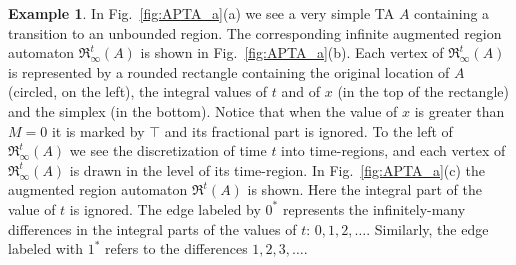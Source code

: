 \documentclass[11pt]{amsart}
\theoremstyle{definition}
\newtheorem{example}[theorem]{Example}
\newcommand{\ARRR}{\mathfrak{R}^t}
\newcommand{\IARRR}{\mathfrak{R}_{\infty}^{t}}
\begin{document}
\begin{example}
	In Fig.~\ref{fig:APTA_a}(a) we see a very simple TA $A$ containing a transition to an unbounded region.
	The corresponding infinite augmented region automaton $\IARRR(A)$ is shown in Fig.~\ref{fig:APTA_a}(b).
	Each vertex of $\IARRR(A)$ is represented by a rounded rectangle containing the original location of $A$ (circled, on the left), the integral values of $t$ and of $x$ (in the top of the rectangle) and the simplex (in the bottom).
	Notice that when the value of $x$ is greater than $M=0$ it is marked by $\top$ and its fractional part is ignored.
	To the left of $\IARRR(A)$ we see the discretization of time $t$ into time-regions, and each vertex of $\IARRR(A)$ is drawn in the level of its time-region.
	In  Fig.~\ref{fig:APTA_a}(c) the augmented region automaton $\ARRR(A)$ is shown.
	Here the integral part of the value of $t$ is ignored.
	The edge labeled by $0^*$ represents the infinitely-many differences in the integral parts of the values of $t$: $0, 1, 2, \ldots$.
	Similarly, the edge labeled with $1^*$ refers to the differences $1, 2, 3, \ldots$.
	\begin{figure}[t]
\centering
\end{figure}
\end{example}
\end{document}
